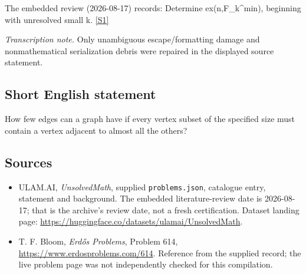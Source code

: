 \documentclass[11pt,a4paper]{article}
\newcommand{\sref}[2]{\hyperlink{source:#1:#2}{[S#2]}}
\begin{document}
The embedded review (2026-08-17) records: Determine ex(n,F\_k\textasciicircum{}min), beginning with unresolved small k. \sref{statement}{1}

{\small\emph{Transcription note.} Only unambiguous escape/formatting damage and nonmathematical serialization debris were repaired in the displayed source statement.}

\subsection{Short English statement}

How few edges can a graph have if every vertex subset of the specified size must contain a vertex adjacent to almost all the others?

\subsection{Sources}

{\small

\begin{itemize}

\item[\hypertarget{source:statement:1}{S1}] ULAM.AI, \emph{UnsolvedMath}, supplied \texttt{problems.json}, catalogue entry, statement and background. The embedded literature-review date is 2026-08-17; that is the archive’s review date, not a fresh certification. Dataset landing page: \url{https://huggingface.co/datasets/ulamai/UnsolvedMath}.

\item[\hypertarget{source:statement:2}{S2}] T. F. Bloom, \emph{Erdős Problems}, Problem 614, \url{https://www.erdosproblems.com/614}. Reference from the supplied record; the live problem page was not independently checked for this compilation.

\end{itemize}

}

\label{end:statement}
\end{document}
